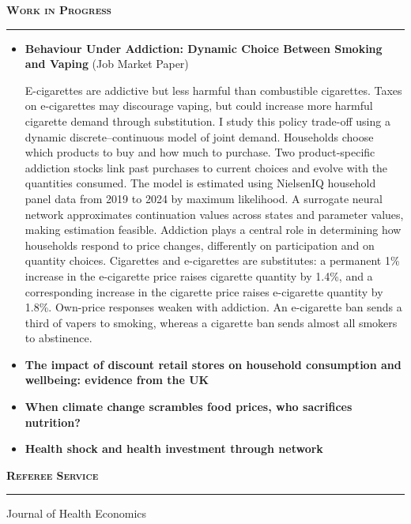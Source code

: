 \documentclass[11pt]{article}
\begin{document}
\noindent\large{\textbf{\textsc{Work in Progress}}}
\vspace{0.2em}
\hrule
\normalsize
\vspace{.4em}
\begin{itemize}[leftmargin=1.5em, labelsep=.6em, itemsep=.4em, topsep=0pt, parsep=0pt, label=$\bullet$]
\item \textbf{Behaviour Under Addiction: Dynamic Choice Between Smoking and Vaping} (Job Market Paper) \par
\vspace{.2em}
{\footnotesize\setlength{\rightskip}{1.5em}
E-cigarettes are addictive but less harmful than combustible cigarettes. Taxes on e-cigarettes may discourage vaping, but could increase more harmful cigarette demand through substitution. I study this policy trade-off using a dynamic discrete--continuous model of joint demand. Households choose which products to buy and how much to purchase. Two product-specific addiction stocks link past purchases to current choices and evolve with the quantities consumed. The model is estimated using NielsenIQ household panel data from 2019 to 2024 by maximum likelihood. A surrogate neural network approximates continuation values across states and parameter values, making estimation feasible. Addiction plays a central role in determining how households respond to price changes, differently on participation and on quantity choices. Cigarettes and e-cigarettes are substitutes: a permanent 1\% increase in the e-cigarette price raises cigarette quantity by 1.4\%, and a corresponding increase in the cigarette price raises e-cigarette quantity by 1.8\%. Own-price responses weaken with addiction. An e-cigarette ban sends a third of vapers to smoking, whereas a cigarette ban sends almost all smokers to abstinence.}
\item \textbf{The impact of discount retail stores on household consumption and wellbeing: evidence from the UK}
\item \textbf{When climate change scrambles food prices, who sacrifices nutrition?}
\item \textbf{Health shock and health investment through network}
\end{itemize}
\vspace{0.6em}


\noindent\large{\textbf{\textsc{Referee Service}}}
\vspace{0.2em}
\hrule 
\normalsize
\vspace{0.3em}
Journal of Health Economics
\vspace{0.6em}
\end{document}

